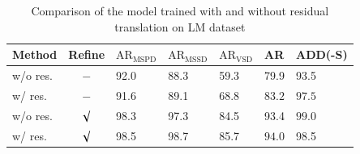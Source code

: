 \documentclass[12pt,DIV14,BCOR12mm,a4paper,footinclude=false,headinclude,parskip=half-,twoside,openright,cleardoublepage=empty,toc=index,bibliography=totoc,listof=totoc]{scrreprt}
\numberwithin{equation}{chapter}
\begin{document}
\begin{table}[H]
  \centering
  \caption{Comparison of the model trained with and without residual translation on LM dataset}
  \label{tab:ab_trans_lm}
  \begin{tabular}{l | c | C{16mm} C{16mm} C{16mm}| C{16mm}| C{16mm}}
      \toprule
      Method & Refine & $\text{AR}_{\text{MSPD}}$ & $\text{AR}_{\text{MSSD}}$ & $\text{AR}_{\text{VSD}}$ & AR & ADD(-S) \\
      \midrule
      w/o res. & $-$     & 92.0 & 88.3 & 59.3 & 79.9 & 93.5 \\
      w/ res.  & $-$     & 91.6 & 89.1 & 68.8 & $\mathbf{83.2}$ & $\mathbf{97.5}$ \\
      w/o res. & $\surd$ & 98.3 & 97.3 & 84.5 & 93.4 & $\mathbf{99.0}$ \\
      w/ res.  & $\surd$ & 98.5 & 98.7 & 85.7 & $\mathbf{94.0}$ & 98.5 \\
      \bottomrule
  \end{tabular}
\end{table}

\newpage
\end{document}
